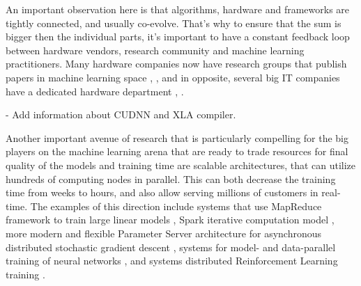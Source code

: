 An important observation here is that algorithms, hardware and frameworks are tightly connected,
and usually co-evolve. That's why to ensure that the sum is bigger then the individual parts,
it's important to have a constant feedback loop between hardware vendors, research community
and machine learning practitioners. Many hardware companies now have research groups
that publish papers in machine learning space \cite{GA3C}, \cite{IntelVizDoom}, and in opposite,
several big IT companies have a dedicated hardware department \cite{TPU}, \cite{AppleCore}.

- Add information about CUDNN and XLA compiler.

Another important avenue of research that is particularly compelling for the big players on the machine
learning arena that are ready to trade resources for final quality of the models and training time
are scalable architectures, that can utilize hundreds of computing nodes
in parallel. This can both decrease the training time from weeks to hours, and also allow
serving millions of customers in real-time. The examples of this direction include systems
that use MapReduce \cite{MapReduce} framework to train large linear models \cite{Sibyl},
Spark iterative computation model \cite{MLLib}, more modern and flexible Parameter Server architecture
for asynchronous distributed stochastic gradient descent \cite{Hogwild}, systems for model- and
data-parallel training of neural networks \cite{DistBelief}, and systems distributed
Reinforcement Learning training \cite{GORILA}.


